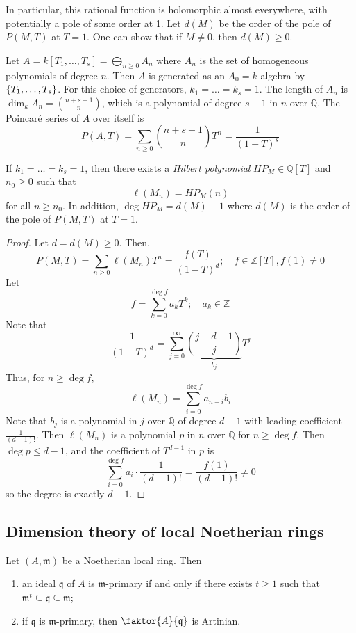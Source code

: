 In particular, this rational function is holomorphic almost everywhere, with potentially a pole of some order at 1.
Let \( d(M) \) be the order of the pole of \( P(M, T) \) at \( T = 1 \).
One can show that if \( M \neq 0 \), then \( d(M) \geq 0 \).
\begin{example}
    Let \( A = k[T_1, \dots, T_s] = \bigoplus_{n \geq 0} A_n \) where \( A_n \) is the set of homogeneous polynomials of degree \( n \).
    Then \( A \) is generated as an \( A_0 = k \)-algebra by \( \qty{T_1, \dots, T_s} \).
    For this choice of generators, \( k_1 = \dots = k_s = 1 \).
    The length of \( A_n \) is \( \dim_k A_n = \binom{n+s-1}{n} \), which is a polynomial of degree \( s - 1 \) in \( n \) over \( \mathbb Q \).
    The Poincar\'e series of \( A \) over itself is
    \[ P(A, T) = \sum_{n \geq 0} \binom{n+s-1}{n} T^n = \frac{1}{(1 - T)^s} \]
\end{example}
\begin{proposition}
    If \( k_1 = \dots = k_s = 1 \), then there exists a \emph{Hilbert polynomial} \( HP_M \in \mathbb Q[T] \) and \( n_0 \geq 0 \) such that
    \[ \ell(M_n) = HP_M(n) \]
    for all \( n \geq n_0 \).
    In addition, \( \deg HP_M = d(M) - 1 \) where \( d(M) \) is the order of the pole of \( P(M, T) \) at \( T = 1 \).
\end{proposition}
\begin{proof}
    Let \( d = d(M) \geq 0 \).
    Then,
    \[ P(M, T) = \sum_{n \geq 0} \ell(M_n) T^n = \frac{f(T)}{(1 - T)^d};\quad f \in \mathbb Z[T], f(1) \neq 0 \]
    Let
    \[ f = \sum_{k=0}^{\deg f} a_k T^k;\quad a_k \in \mathbb Z \]
    Note that
    \[ \frac{1}{(1 - T)^d} = \sum_{j=0}^\infty \underbrace{\binom{j+d-1}{j}}_{b_j} T^j \]
    Thus, for \( n \geq \deg f \),
    \[ \ell(M_n) = \sum_{i=0}^{\deg f} a_{n-i} b_i \]
    Note that \( b_j \) is a polynomial in \( j \) over \( \mathbb Q \) of degree \( d - 1 \) with leading coefficient \( \frac{1}{(d-1)!} \).
    Then \( \ell(M_n) \) is a polynomial \( p \) in \( n \) over \( \mathbb Q \) for \( n \geq \deg f \).
    Then \( \deg p \leq d - 1 \), and the coefficient of \( T^{d-1} \) in \( p \) is
    \[ \sum_{i=0}^{\deg f} a_i \cdot \frac{1}{(d-1)!} = \frac{f(1)}{(d-1)!} \neq 0 \]
    so the degree is exactly \( d - 1 \).
\end{proof}

\subsection{Dimension theory of local Noetherian rings}
\begin{lemma}
    Let \( (A, \mathfrak m) \) be a Noetherian local ring.
    Then
    \begin{enumerate}
        \item an ideal \( \mathfrak q \) of \( A \) is \( \mathfrak m \)-primary if and only if there exists \( t \geq 1 \) such that \( \mathfrak m^t \subseteq \mathfrak q \subseteq \mathfrak m \);
        \item if \( \mathfrak q \) is \( \mathfrak m \)-primary, then \( \faktor{A}{\mathfrak q} \) is Artinian.
    \end{enumerate}
\end{lemma}
